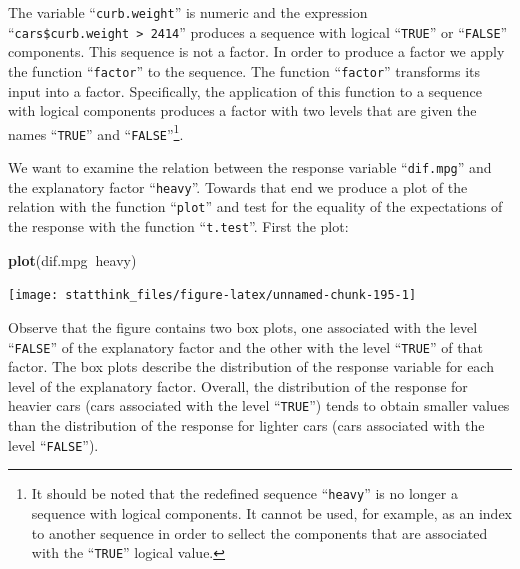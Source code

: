 \documentclass[]{krantz}
\makeatletter
\newenvironment{Shaded}{\begin{snugshade}}{\end{snugshade}}
\newcommand{\DecValTok}[1]{\textcolor[rgb]{0.00,0.00,0.81}{#1}}
\newcommand{\KeywordTok}[1]{\textcolor[rgb]{0.13,0.29,0.53}{\textbf{#1}}}
\newcommand{\NormalTok}[1]{#1}
\newcommand{\OperatorTok}[1]{\textcolor[rgb]{0.81,0.36,0.00}{\textbf{#1}}}
\newcommand{\StringTok}[1]{\textcolor[rgb]{0.31,0.60,0.02}{#1}}
\newenvironment{kframe}{%
\medskip{}
\setlength{\fboxsep}{.8em}
 \def\at@end@of@kframe{}%
 \ifinner\ifhmode%
  \def\at@end@of@kframe{\end{minipage}}%
  \begin{minipage}{\columnwidth}%
 \fi\fi%
 \def\FrameCommand##1{\hskip\@totalleftmargin \hskip-\fboxsep
 \colorbox{shadecolor}{##1}\hskip-\fboxsep
     \hskip-\linewidth \hskip-\@totalleftmargin \hskip\columnwidth}%
 \MakeFramed {\advance\hsize-\width
   \@totalleftmargin\z@ \linewidth\hsize
   \@setminipage}}%
 {\par\unskip\endMakeFramed%
 \at@end@of@kframe}
\renewenvironment{Shaded}{\begin{kframe}}{\end{kframe}}
\theoremstyle{definition}
\theoremstyle{definition}
\theoremstyle{definition}
\theoremstyle{remark}
\makeatother
\begin{document}
\begin{Shaded}
\end{Shaded}

The variable ``\texttt{curb.weight}'' is numeric and the expression
``\texttt{cars\$curb.weight\ \textgreater{}\ 2414}'' produces a sequence with logical ``\texttt{TRUE}'' or
``\texttt{FALSE}'' components. This sequence is not a factor. In order to produce
a factor we apply the function ``\texttt{factor}'' to the sequence. The function
``\texttt{factor}'' transforms its input into a factor. Specifically, the
application of this function to a sequence with logical components
produces a factor with two levels that are given the names ``\texttt{TRUE}'' and
``\texttt{FALSE}''\footnote{It should be noted that the redefined sequence ``\texttt{heavy}'' is no
  longer a sequence with logical components. It cannot be used, for
  example, as an index to another sequence in order to sellect the
  components that are associated with the ``\texttt{TRUE}'' logical value.}.

We want to examine the relation between the response variable
``\texttt{dif.mpg}'' and the explanatory factor ``\texttt{heavy}''. Towards that end we
produce a plot of the relation with the function ``\texttt{plot}'' and test for
the equality of the expectations of the response with the function
``\texttt{t.test}''. First the plot:

\begin{Shaded}
\begin{Highlighting}[]
\KeywordTok{plot}\NormalTok{(dif.mpg}\OperatorTok{~}\NormalTok{heavy)}
\end{Highlighting}
\end{Shaded}

\begin{center}\texttt{[image: statthink\_files/figure-latex/unnamed-chunk-195-1]} \end{center}

Observe that the figure contains two box plots, one associated with the
level ``\texttt{FALSE}'' of the explanatory factor and the other with the level
``\texttt{TRUE}'' of that factor. The box plots describe the distribution of the
response variable for each level of the explanatory factor. Overall, the
distribution of the response for heavier cars (cars associated with the
level ``\texttt{TRUE}'') tends to obtain smaller values than the distribution of
the response for lighter cars (cars associated with the level
``\texttt{FALSE}'').
\end{document}
